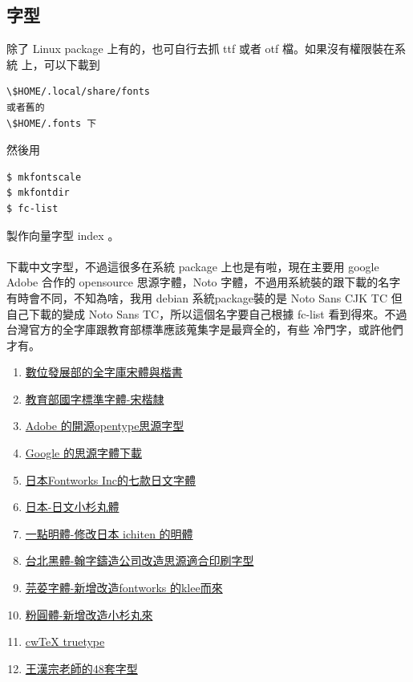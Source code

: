 \subsection{字型}
除了 Linux package 上有的，也可自行去抓 ttf 或者 otf 檔。如果沒有權限裝在系統
上，可以下載到 
\begin{verbatim}
\$HOME/.local/share/fonts 
或者舊的
\$HOME/.fonts 下
\end{verbatim}
然後用
\begin{verbatim}
$ mkfontscale
$ mkfontdir
$ fc-list
\end{verbatim}
製作向量字型 index 。
\\\\
下載中文字型，不過這很多在系統 package 上也是有啦，現在主要用 google
Adobe 合作的 opensource 思源字體，Noto 字體，不過用系統裝的跟下載的名字
有時會不同，不知為啥，我用 debian 系統package裝的是
Noto Sans CJK TC 但自己下載的變成 Noto Sans TC，所以這個名字要自己根據
fc-list 看到得來。不過台灣官方的全字庫跟教育部標準應該蒐集字是最齊全的，有些
冷門字，或許他們才有。
\begin{enumerate}
\item \href{https://data.gov.tw/dataset/5961}{數位發展部的全字庫宋體與楷書}
\item \href{https://language.moe.gov.tw/result.aspx?classify_sn=23&subclassify_sn=436}{教育部國字標準字體-宋楷隸}
\item \href{https://source.typekit.com/source-han-serif}{Adobe 的開源opentype思源字型}
\item \href{https://fonts.google.com/}{Google 的思源字體下載}
\item \href{https://github.com/fontworks-fonts}{日本Fontworks Inc的七款日文字體}
\item \href{https://github.com/googlefonts/kosugi-maru}{日本-日文小杉丸體}
\item \href{https://github.com/ichitenfont/I.Ming}{一點明體-修改日本 ichiten 的明體}
\item \href{https://sites.google.com/view/jtfoundry/zh-tw}{台北黑體-翰字鑄造公司改造思源適合印刷字型}
\item \href{https://github.com/ButTaiwan/iansui}{芫荽字體-新增改造fontworks 的klee而來}
\item \href{https://github.com/justfont/open-huninn-font}{粉圓體-新增改造小杉丸來}
\item \href{https://github.com/l10n-tw/cwtex-q-fonts}{cwTeX truetype}
\item \href{https://code.google.com/archive/p/wangfonts/}{王漢宗老師的48套字型}
\end{enumerate}
